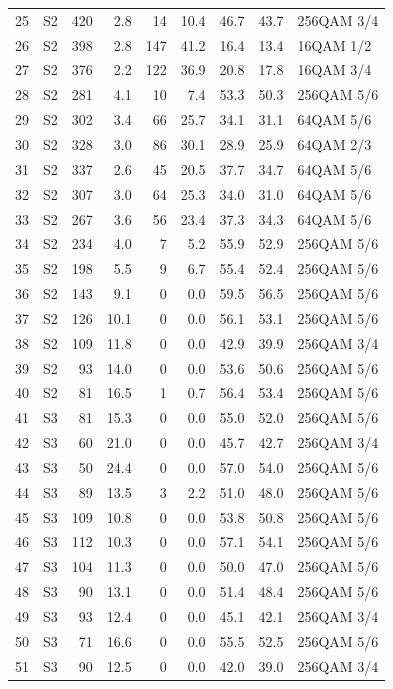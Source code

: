 \begin{longtable}{rlrrrrrrl}
25 & S2 & 420 & 2.8 & 14 & 10.4 & 46.7 & 43.7 & 256QAM 3/4\\
26 & S2 & 398 & 2.8 & 147 & 41.2 & 16.4 & 13.4 & 16QAM 1/2\\
27 & S2 & 376 & 2.2 & 122 & 36.9 & 20.8 & 17.8 & 16QAM 3/4\\
28 & S2 & 281 & 4.1 & 10 & 7.4 & 53.3 & 50.3 & 256QAM 5/6\\
29 & S2 & 302 & 3.4 & 66 & 25.7 & 34.1 & 31.1 & 64QAM 5/6\\
30 & S2 & 328 & 3.0 & 86 & 30.1 & 28.9 & 25.9 & 64QAM 2/3\\
31 & S2 & 337 & 2.6 & 45 & 20.5 & 37.7 & 34.7 & 64QAM 5/6\\
32 & S2 & 307 & 3.0 & 64 & 25.3 & 34.0 & 31.0 & 64QAM 5/6\\
33 & S2 & 267 & 3.6 & 56 & 23.4 & 37.3 & 34.3 & 64QAM 5/6\\
34 & S2 & 234 & 4.0 & 7 & 5.2 & 55.9 & 52.9 & 256QAM 5/6\\
35 & S2 & 198 & 5.5 & 9 & 6.7 & 55.4 & 52.4 & 256QAM 5/6\\
36 & S2 & 143 & 9.1 & 0 & 0.0 & 59.5 & 56.5 & 256QAM 5/6\\
37 & S2 & 126 & 10.1 & 0 & 0.0 & 56.1 & 53.1 & 256QAM 5/6\\
38 & S2 & 109 & 11.8 & 0 & 0.0 & 42.9 & 39.9 & 256QAM 3/4\\
39 & S2 & 93 & 14.0 & 0 & 0.0 & 53.6 & 50.6 & 256QAM 5/6\\
40 & S2 & 81 & 16.5 & 1 & 0.7 & 56.4 & 53.4 & 256QAM 5/6\\
41 & S3 & 81 & 15.3 & 0 & 0.0 & 55.0 & 52.0 & 256QAM 5/6\\
42 & S3 & 60 & 21.0 & 0 & 0.0 & 45.7 & 42.7 & 256QAM 3/4\\
43 & S3 & 50 & 24.4 & 0 & 0.0 & 57.0 & 54.0 & 256QAM 5/6\\
44 & S3 & 89 & 13.5 & 3 & 2.2 & 51.0 & 48.0 & 256QAM 5/6\\
45 & S3 & 109 & 10.8 & 0 & 0.0 & 53.8 & 50.8 & 256QAM 5/6\\
46 & S3 & 112 & 10.3 & 0 & 0.0 & 57.1 & 54.1 & 256QAM 5/6\\
47 & S3 & 104 & 11.3 & 0 & 0.0 & 50.0 & 47.0 & 256QAM 5/6\\
48 & S3 & 90 & 13.1 & 0 & 0.0 & 51.4 & 48.4 & 256QAM 5/6\\
49 & S3 & 93 & 12.4 & 0 & 0.0 & 45.1 & 42.1 & 256QAM 3/4\\
50 & S3 & 71 & 16.6 & 0 & 0.0 & 55.5 & 52.5 & 256QAM 5/6\\
51 & S3 & 90 & 12.5 & 0 & 0.0 & 42.0 & 39.0 & 256QAM 3/4\\

\end{longtable}

